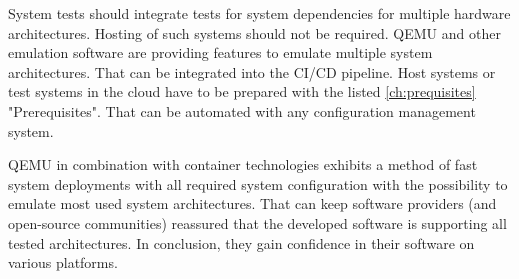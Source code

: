 System tests should integrate tests for system dependencies for multiple hardware architectures. Hosting of such systems should not be required. \gls{QEMU} and other emulation software are providing features to emulate multiple system architectures.
That can be integrated into the \gls{CI/CD} pipeline. Host systems or test systems in the cloud have to be prepared with the listed \ref{ch:prequisites} "Prerequisites". That can be automated with any configuration management system.

\gls{QEMU} in combination with container technologies exhibits a method of fast system deployments with all required system configuration with the possibility to emulate most used system architectures. That can keep software providers (and open-source communities) reassured that the developed software is supporting all tested architectures. 
In conclusion, they gain confidence in their software on various platforms.
